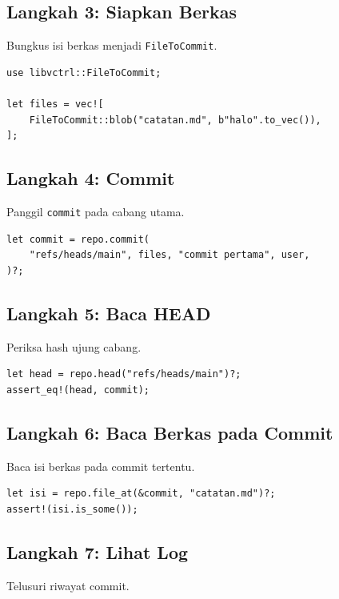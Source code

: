 \documentclass[11pt,a4paper]{article}
\begin{document}
\subsection{Langkah 3: Siapkan Berkas}

Bungkus isi berkas menjadi \texttt{FileToCommit}.

\begin{lstlisting}[style=code]
use libvctrl::FileToCommit;

let files = vec![
    FileToCommit::blob("catatan.md", b"halo".to_vec()),
];
\end{lstlisting}

\subsection{Langkah 4: Commit}

Panggil \texttt{commit} pada cabang utama.

\begin{lstlisting}[style=code]
let commit = repo.commit(
    "refs/heads/main", files, "commit pertama", user,
)?;
\end{lstlisting}

\subsection{Langkah 5: Baca HEAD}

Periksa hash ujung cabang.

\begin{lstlisting}[style=code]
let head = repo.head("refs/heads/main")?;
assert_eq!(head, commit);
\end{lstlisting}

\subsection{Langkah 6: Baca Berkas pada Commit}

Baca isi berkas pada commit tertentu.

\begin{lstlisting}[style=code]
let isi = repo.file_at(&commit, "catatan.md")?;
assert!(isi.is_some());
\end{lstlisting}

\subsection{Langkah 7: Lihat Log}

Telusuri riwayat commit.
\end{document}
